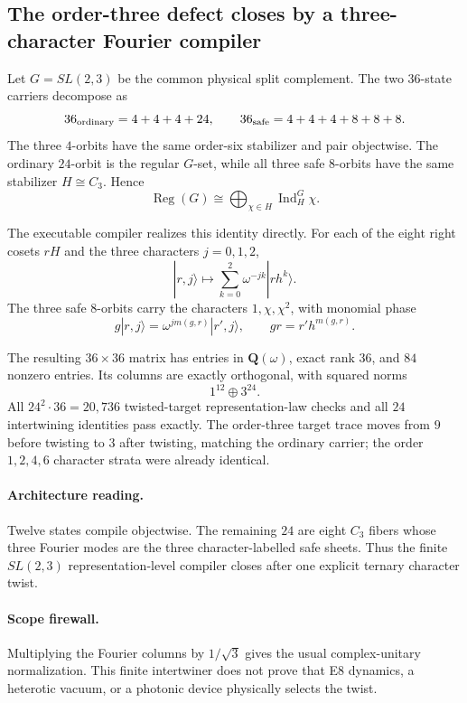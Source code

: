 \subsection*{The order-three defect closes by a three-character Fourier compiler}

Let $G=SL(2,3)$ be the common physical split complement.  The two
$36$-state carriers decompose as
\[
36_{\rm ordinary}=4+4+4+24,
\qquad
36_{\rm safe}=4+4+4+8+8+8.
\]
The three $4$-orbits have the same order-six stabilizer and pair objectwise.
The ordinary $24$-orbit is the regular $G$-set, while all three safe
$8$-orbits have the same stabilizer $H\cong C_3$.  Hence
\[
\boxed{
\operatorname{Reg}(G)
\cong
\bigoplus_{\chi\in\widehat H}\operatorname{Ind}_{H}^{G}\chi .
}
\]

The executable compiler realizes this identity directly.  For each of the
eight right cosets $rH$ and the three characters $j=0,1,2$,
\[
|r,j\rangle\longmapsto
\sum_{k=0}^{2}\omega^{-jk}|rh^k\rangle .
\]
The three safe $8$-orbits carry the characters
$1,\chi,\chi^2$, with monomial phase
\[
g|r,j\rangle=\omega^{jm(g,r)}|r',j\rangle,
\qquad
gr=r'h^{m(g,r)}.
\]

The resulting $36\times36$ matrix has entries in $\mathbf Q(\omega)$,
exact rank $36$, and $84$ nonzero entries.  Its columns are exactly orthogonal,
with squared norms
\[
1^{12}\oplus3^{24}.
\]
All $24^2\cdot36=20{,}736$ twisted-target representation-law checks and all
$24$ intertwining identities pass exactly.  The order-three target trace moves
from $9$ before twisting to $3$ after twisting, matching the ordinary carrier;
the order $1,2,4,6$ character strata were already identical.

\paragraph{Architecture reading.}
Twelve states compile objectwise.  The remaining $24$ are eight $C_3$ fibers
whose three Fourier modes are the three character-labelled safe sheets.
Thus the finite $SL(2,3)$ representation-level compiler closes after one
explicit ternary character twist.

\paragraph{Scope firewall.}
Multiplying the Fourier columns by $1/\sqrt3$ gives the usual complex-unitary
normalization.  This finite intertwiner does not prove that E8 dynamics, a
heterotic vacuum, or a photonic device physically selects the twist.
